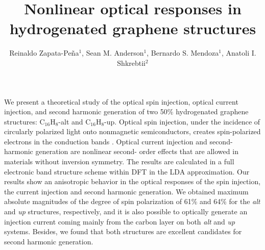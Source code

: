 \documentclass{./RiaoOptilas2016}
\begin{document}
\title{Nonlinear optical responses in hydrogenated graphene structures}

\author{Reinaldo Zapata-Pe\~na$^{1}$, Sean M. Anderson$^{1}$, Bernardo S. 
Mendoza$^{1}$, Anatoli I. Shkrebtii$^{2}$ }
\bigskip

\address{
$^1$Centro de Investigaciones en \'Optica, Le\'on, Guanajuato 37150, M\'exico\\
\bigskip
$^2$University of Ontario, Institute of Technology, Oshawa, ON, L1H 7L7, Canada}


We present a theoretical study of the optical spin injection, optical current
injection, and second harmonic generation of two 50\% hydrogenated graphene
structures: C$_{16}$H$_{8}$-alt and C$_{16}$H$_{8}$-up. Optical spin
injection, under the incidence of circularly polarized light onto nonmagnetic
semiconductors, creates spin-polarized electrons in the conduction bands
\cite{dyakonovOO84}. Optical current injection\cite{arzatePRB14} and second-
harmonic generation\cite{loudonOUP00,andersonPRB15} are nonlinear second-
order effects that are allowed in materials without inversion symmetry. The
results are calculated in a full electronic band structure scheme within DFT
in the LDA approximation. Our results show an anisotropic behavior in the
optical responses of the spin injection, the current injection and second
harmonic generation. We obtained maximum absolute magnitudes of the degree of
spin polarization of 61\% and 64\% for the \emph{alt} and \emph{up}
structures, respectively, and it is also possible to optically generate an
injection current coming mainly from the carbon layer on both \emph{alt} and
\emph{up} systems. Besides, we found that both structures are excellent
candidates for second harmonic generation.
\end{document}
